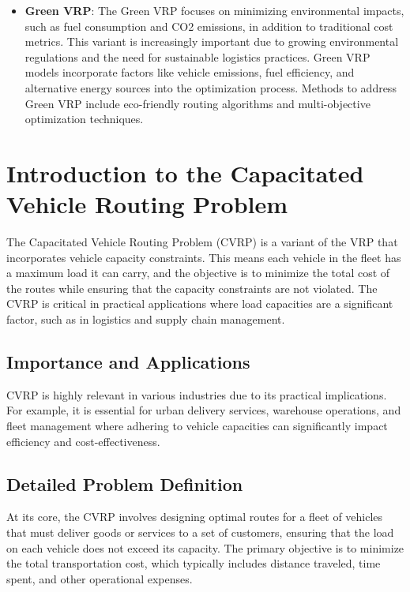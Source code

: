 \documentclass{article}
\begin{document}
\begin{itemize}
        \item \textbf{Green VRP}:
        The Green VRP focuses on minimizing environmental impacts, such as fuel consumption and CO2 emissions, in addition to traditional cost metrics. This variant is increasingly important due to growing environmental regulations and the need for sustainable logistics practices. Green VRP models incorporate factors like vehicle emissions, fuel efficiency, and alternative energy sources into the optimization process. Methods to address Green VRP include eco-friendly routing algorithms and multi-objective optimization techniques.\cite{asghari2021}

    \end{itemize}

    \newpage


    \section{Introduction to the Capacitated Vehicle Routing Problem}\label{sec:intro_cvrp}

    The Capacitated Vehicle Routing Problem (CVRP) is a variant of the VRP that incorporates vehicle capacity constraints. This means each vehicle in the fleet has a maximum load it can carry, and the objective is to minimize the total cost of the routes while ensuring that the capacity constraints are not violated. The CVRP is critical in practical applications where load capacities are a significant factor, such as in logistics and supply chain management.

    \subsection{Importance and Applications}\label{subsec:importance-and-applications}

    CVRP is highly relevant in various industries due to its practical implications. For example, it is essential for urban delivery services, warehouse operations, and fleet management where adhering to vehicle capacities can significantly impact efficiency and cost-effectiveness.

    \subsection{Detailed Problem Definition}\label{subsec:detailed-problem-definition}

    At its core, the CVRP involves designing optimal routes for a fleet of vehicles that must deliver goods or services to a set of customers, ensuring that the load on each vehicle does not exceed its capacity. The primary objective is to minimize the total transportation cost, which typically includes distance traveled, time spent, and other operational expenses.
\end{document}
